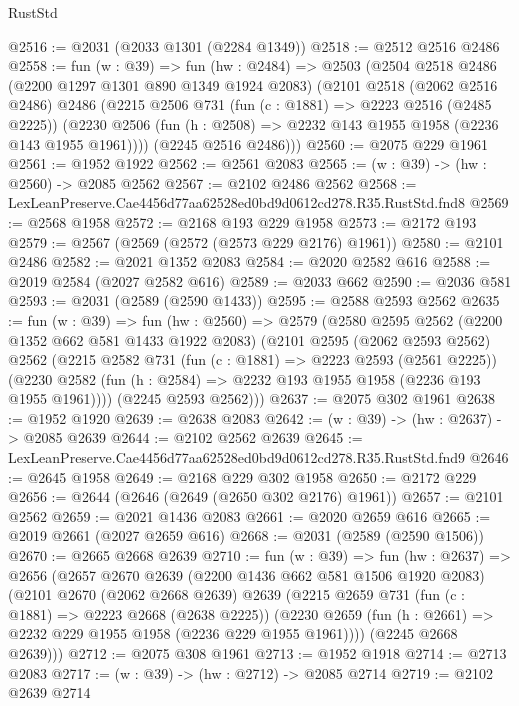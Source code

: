 \begin{lexlean}{RustStd}
\begin{coremodule}
@2516 := @2031 (@2033 @1301 (@2284 @1349))
@2518 := @2512 @2516 @2486
@2558 := fun (w : @39) =>
  fun (hw : @2484) =>
  @2503
    (@2504
      @2518
      @2486
      (@2200 @1297 @1301 @890 @1349 @1924 @2083)
      (@2101
        @2518
        (@2062 @2516 @2486)
        @2486
        (@2215
          @2506
          @731
          (fun (c : @1881) => @2223 @2516 (@2485 @2225))
          (@2230 @2506 (fun (h : @2508) => @2232 @143 @1955 @1958 (@2236 @143 @1955 @1961))))
        (@2245 @2516 @2486)))
@2560 := @2075 @229 @1961
@2561 := @1952 @1922
@2562 := @2561 @2083
@2565 := (w : @39) -> (hw : @2560) -> @2085 @2562
@2567 := @2102 @2486 @2562
@2568 := LexLeanPreserve.Cae4456d77aa62528ed0bd9d0612cd278.R35.RustStd.fnd8
@2569 := @2568 @1958
@2572 := @2168 @193 @229 @1958
@2573 := @2172 @193
@2579 := @2567 (@2569 (@2572 (@2573 @229 @2176) @1961))
@2580 := @2101 @2486
@2582 := @2021 @1352 @2083
@2584 := @2020 @2582 @616
@2588 := @2019 @2584 (@2027 @2582 @616)
@2589 := @2033 @662
@2590 := @2036 @581
@2593 := @2031 (@2589 (@2590 @1433))
@2595 := @2588 @2593 @2562
@2635 := fun (w : @39) =>
  fun (hw : @2560) =>
  @2579
    (@2580
      @2595
      @2562
      (@2200 @1352 @662 @581 @1433 @1922 @2083)
      (@2101
        @2595
        (@2062 @2593 @2562)
        @2562
        (@2215
          @2582
          @731
          (fun (c : @1881) => @2223 @2593 (@2561 @2225))
          (@2230 @2582 (fun (h : @2584) => @2232 @193 @1955 @1958 (@2236 @193 @1955 @1961))))
        (@2245 @2593 @2562)))
@2637 := @2075 @302 @1961
@2638 := @1952 @1920
@2639 := @2638 @2083
@2642 := (w : @39) -> (hw : @2637) -> @2085 @2639
@2644 := @2102 @2562 @2639
@2645 := LexLeanPreserve.Cae4456d77aa62528ed0bd9d0612cd278.R35.RustStd.fnd9
@2646 := @2645 @1958
@2649 := @2168 @229 @302 @1958
@2650 := @2172 @229
@2656 := @2644 (@2646 (@2649 (@2650 @302 @2176) @1961))
@2657 := @2101 @2562
@2659 := @2021 @1436 @2083
@2661 := @2020 @2659 @616
@2665 := @2019 @2661 (@2027 @2659 @616)
@2668 := @2031 (@2589 (@2590 @1506))
@2670 := @2665 @2668 @2639
@2710 := fun (w : @39) =>
  fun (hw : @2637) =>
  @2656
    (@2657
      @2670
      @2639
      (@2200 @1436 @662 @581 @1506 @1920 @2083)
      (@2101
        @2670
        (@2062 @2668 @2639)
        @2639
        (@2215
          @2659
          @731
          (fun (c : @1881) => @2223 @2668 (@2638 @2225))
          (@2230 @2659 (fun (h : @2661) => @2232 @229 @1955 @1958 (@2236 @229 @1955 @1961))))
        (@2245 @2668 @2639)))
@2712 := @2075 @308 @1961
@2713 := @1952 @1918
@2714 := @2713 @2083
@2717 := (w : @39) -> (hw : @2712) -> @2085 @2714
@2719 := @2102 @2639 @2714

\end{coremodule}
\end{lexlean}
